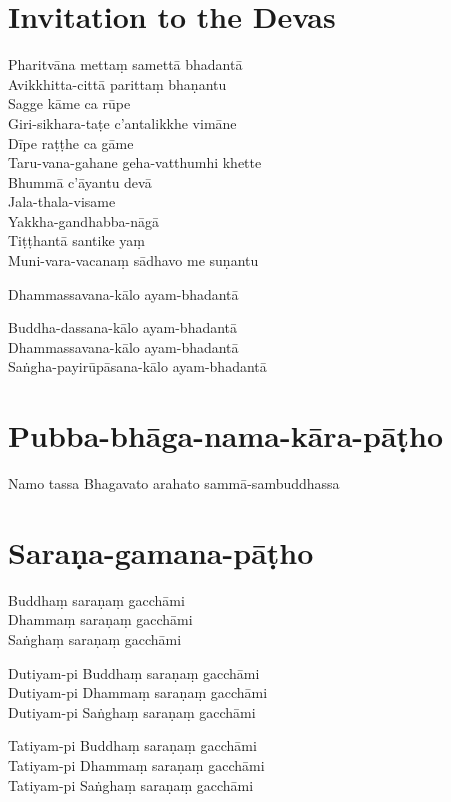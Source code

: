 
\chapter[Invitation]{Invitation to the Devas}

Pharitvāna mettaṃ samettā bhadantā\\
Avikkhitta-cittā parittaṃ bhaṇantu\\
Sagge kāme ca rūpe\\
Giri-sikhara-taṭe c'antalikkhe vimāne\\
Dīpe raṭṭhe ca gāme\\
Taru-vana-gahane geha-vatthumhi khette\\
Bhummā c'āyantu devā\\
Jala-thala-visame\\
Yakkha-gandhabba-nāgā\\
Tiṭṭhantā santike yaṃ\\
Muni-vara-vacanaṃ sādhavo me suṇantu

Dhammassavana-kālo ayam-bhadantā


Buddha-dassana-kālo ayam-bhadantā\\
Dhammassavana-kālo ayam-bhadantā\\
Saṅgha-payirūpāsana-kālo ayam-bhadantā

\chapter{Pubba-bhāga-nama-kāra-pāṭho}

Namo tassa Bhagavato arahato sammā-sambuddhassa


\chapter{Saraṇa-gamana-pāṭho}

Buddhaṃ saraṇaṃ gacchāmi\\
Dhammaṃ saraṇaṃ gacchāmi\\
Saṅghaṃ saraṇaṃ gacchāmi

Dutiyam-pi Buddhaṃ saraṇaṃ gacchāmi\\
Dutiyam-pi Dhammaṃ saraṇaṃ gacchāmi\\
Dutiyam-pi Saṅghaṃ saraṇaṃ gacchāmi

Tatiyam-pi Buddhaṃ saraṇaṃ gacchāmi\\
Tatiyam-pi Dhammaṃ saraṇaṃ gacchāmi\\
Tatiyam-pi Saṅghaṃ saraṇaṃ gacchāmi

